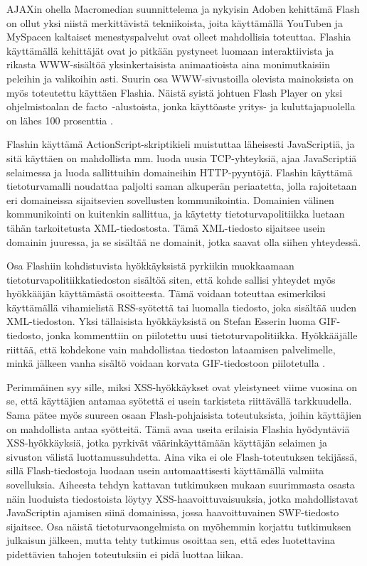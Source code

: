 AJAXin ohella Macromedian suunnittelema ja nykyisin Adoben kehittämä
Flash on ollut yksi niistä merkittävistä tekniikoista, joita käyttämällä
YouTuben ja MySpacen kaltaiset menestyspalvelut ovat olleet
mahdollisia toteuttaa. Flashia käyttämällä kehittäjät ovat jo pitkään
pystyneet luomaan interaktiivista ja rikasta WWW-sisältöä
yksinkertaisista animaatioista aina monimutkaisiin peleihin ja
valikoihin asti. Suurin osa WWW-si\-vus\-toil\-la olevista mainoksista on
myös toteutettu käyttäen Flashia. Näistä syistä johtuen Flash Player
on yksi ohjelmistoalan de facto~-alustoista, jonka käyttöaste yritys-
ja kuluttajapuolella on lähes 100 prosenttia \cite{Flash}.

Flashin käyttämä ActionScript-skriptikieli muistuttaa läheisesti
JavaScriptiä, ja sitä käyttäen on mahdollista mm. luoda uusia
TCP-yhteyksiä, ajaa JavaScriptiä selaimessa ja luoda sallittuihin
domaineihin HTTP-pyyn\-tö\-jä. Flashin käyttämä tietoturvamalli noudattaa
paljolti saman alkuperän periaatetta, jolla rajoitetaan eri
domaineissa sijaitsevien sovellusten kommunikointia. Domainien välinen
kommunikointi on kuitenkin sallittua, ja käytetty tietoturvapolitiikka
luetaan tähän tarkoitetusta XML-tiedostosta. Tämä XML-tiedosto
sijaitsee usein domainin juuressa, ja se sisältää ne domainit, jotka
saavat olla siihen yhteydessä.

Osa Flashiin kohdistuvista hyökkäyksistä pyrkiikin muokkaamaan
tietoturvapolitiikkatiedoston sisältöä siten, että kohde sallisi
yhteydet myös hyökkääjän käyttämästä osoitteesta. Tämä voidaan
toteuttaa esimerkiksi käyttämällä vihamielistä RSS-syötettä tai
luomalla tiedosto, joka sisältää uuden XML-tiedoston. Yksi tällaisista
hyökkäyksistä on Stefan Esserin luoma GIF-tiedosto, jonka kommenttiin
on piilotettu uusi tietoturvapolitiikka. Hyökkääjälle riittää, että
kohdekone vain mahdollistaa tiedoston lataamisen palvelimelle, minkä
jälkeen vanha sisältö voidaan korvata GIF-tiedostoon piilotetulla
\cite{WEB2}.

Perimmäinen syy sille, miksi XSS-hyökkäykset ovat yleistyneet viime
vuosina on se, että käyttäjien antamaa syötettä ei usein tarkisteta
riittävällä tarkkuudella. Sama pätee myös suureen osaan
Flash-pohjaisista toteutuksista, joihin käyttäjien on mahdollista
antaa syötteitä. Tämä avaa useita erilaisia Flashia hyödyntäviä
XSS-hyökkäyksiä, jotka pyrkivät väärinkäyttämään käyttäjän selaimen ja
sivuston välistä luottamussuhdetta. Aina vika ei ole Flash-toteutuksen
tekijässä, sillä Flash-tiedostoja luodaan usein automaattisesti
käyttämällä valmiita sovelluksia. Aiheesta tehdyn kattavan tutkimuksen
mukaan \cite{FlashXSS} suurimmasta osasta näin luoduista tiedostoista
löytyy XSS-haavoittuvaisuuksia, jotka mahdollistavat JavaScriptin
ajamisen siinä domainissa, jossa haavoittuvainen SWF-tiedosto
sijaitsee. Osa näistä tietoturvaongelmista on myöhemmin korjattu
tutkimuksen julkaisun jälkeen, mutta tehty tutkimus osoittaa sen, että
edes luotettavina pidettävien tahojen toteutuksiin ei pidä luottaa
liikaa.


